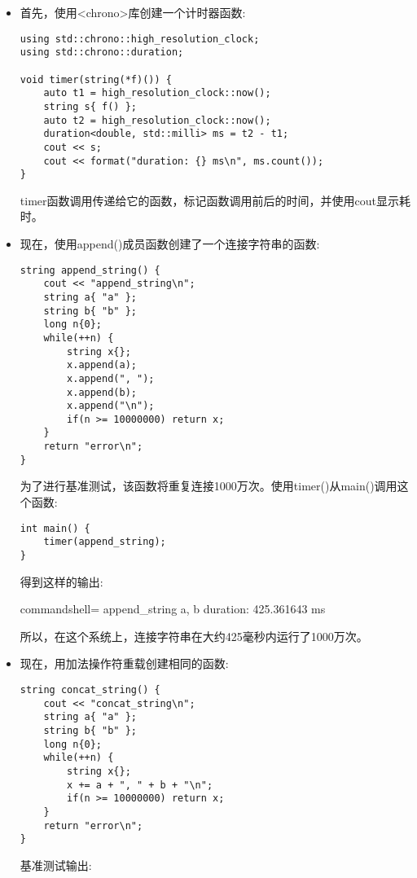 \begin{itemize}
\item 
首先，使用<chrono>库创建一个计时器函数:

\begin{lstlisting}[style=styleCXX]
using std::chrono::high_resolution_clock;
using std::chrono::duration;

void timer(string(*f)()) {
	auto t1 = high_resolution_clock::now();
	string s{ f() };
	auto t2 = high_resolution_clock::now();
	duration<double, std::milli> ms = t2 - t1;
	cout << s;
	cout << format("duration: {} ms\n", ms.count());
}
\end{lstlisting}

timer函数调用传递给它的函数，标记函数调用前后的时间，并使用cout显示耗时。

\item 
现在，使用append()成员函数创建了一个连接字符串的函数:

\begin{lstlisting}[style=styleCXX]
string append_string() {
	cout << "append_string\n";
	string a{ "a" };
	string b{ "b" };
	long n{0};
	while(++n) {
		string x{};
		x.append(a);
		x.append(", ");
		x.append(b);
		x.append("\n");
		if(n >= 10000000) return x;
	}
	return "error\n";
}
\end{lstlisting}

为了进行基准测试，该函数将重复连接1000万次。使用timer()从main()调用这个函数:

\begin{lstlisting}[style=styleCXX]
int main() {
	timer(append_string);
}
\end{lstlisting}

得到这样的输出:

\begin{tcblisting}{commandshell={}}
append_string
a, b
duration: 425.361643 ms
\end{tcblisting}

所以，在这个系统上，连接字符串在大约425毫秒内运行了1000万次。

\item 
现在，用加法操作符重载创建相同的函数:

\begin{lstlisting}[style=styleCXX]
string concat_string() {
	cout << "concat_string\n";
	string a{ "a" };
	string b{ "b" };
	long n{0};
	while(++n) {
		string x{};
		x += a + ", " + b + "\n";
		if(n >= 10000000) return x;
	}
	return "error\n";
}
\end{lstlisting}

基准测试输出:


\end{itemize}
